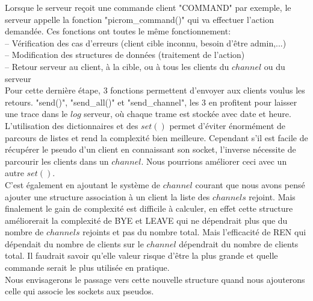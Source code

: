 \documentclass[12pt]{article}
\begin{document}
Lorsque le serveur reçoit une commande client "COMMAND" par exemple, le serveur appelle
la fonction "picrom\_command()" qui va effectuer l'action demandée. Ces fonctions ont toutes
le même fonctionnement:
\\-- Vérification des cas d'erreurs (client cible inconnu, besoin d'être admin,...)
\\-- Modification des structures de données (traitement de l'action)
\\-- Retour serveur au client, à la cible, ou à tous les clients du $channel$ ou du serveur
\\Pour cette dernière étape, 3 fonctions permettent d'envoyer aux clients voulus les retours.
"send()",
"send\_all()" et "send\_channel", les 3 en profitent pour laisser une trace dans le $log$ serveur, où chaque trame est stockée avec date et heure.
\\

L'utilisation des dictionnaires et des $set()$ permet d'éviter énormément de parcours
de listes et rend la complexité bien meilleure. Cependant s'il est facile de récupérer le
pseudo d'un client en connaissant son socket, l'inverse nécessite de parcourir les clients
dans un $channel$. Nous pourrions améliorer ceci avec un autre $set()$.
\\C'est également en ajoutant le système de $channel$ courant que nous avons pensé ajouter
une structure association à un client la liste des $channels$ rejoint. Mais finalement le
gain de complexité est difficile à calculer, en effet cette structure améliorerait la complexité
de BYE et LEAVE qui ne dépendrait plus que du nombre de $channels$ rejoints et pas du nombre total.
Mais l'efficacité de REN qui dépendait du nombre de clients sur le $channel$ dépendrait du nombre de clients
total. Il faudrait savoir qu'elle valeur risque d'être la plus grande et quelle commande serait
le plus utilisée en pratique.
\\Nous envisagerons le passage vers cette nouvelle structure quand nous ajouterons celle qui
associe les sockets aux pseudos.
\\
\end{document}
